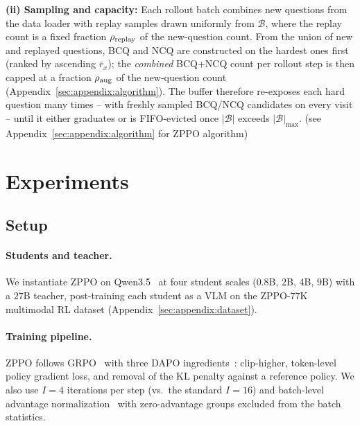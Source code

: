 \documentclass{llmxive}
\begin{document}
\textbf{(ii) Sampling and capacity:}
Each rollout batch combines new questions from the data loader with replay samples drawn uniformly from $\mathcal{B}$, where the replay count is a fixed fraction $\rho_{\rm replay}$ of the new-question count. From the union of new and replayed questions, BCQ and NCQ are constructed on the hardest ones first (ranked by ascending $\bar{r}_x$); the \emph{combined} BCQ+NCQ count per rollout step is then capped at a fraction $\rho_{\rm aug}$ of the new-question count (Appendix~\ref{sec:appendix:algorithm}). The buffer therefore re-exposes each hard question many times -- with freshly sampled BCQ/NCQ candidates on every visit -- until it either graduates or is FIFO-evicted once $|\mathcal{B}|$ exceeds $|\mathcal{B}|_{\max}$. (see Appendix~\ref{sec:appendix:algorithm} for ZPPO algorithm)
\section{Experiments}
\label{sec:experiments}

\subsection{Setup}
\label{sec:experiments:setup}

\paragraph{Students and teacher.}
We instantiate ZPPO on Qwen3.5~\citep{qwen3.5} at four student scales ($0.8$B, $2$B, $4$B, $9$B) with a $27$B teacher, post-training each student as a VLM on the ZPPO-$77$K multimodal RL dataset (Appendix~\ref{sec:appendix:dataset}).

\paragraph{Training pipeline.}
ZPPO follows GRPO~\citep{shao2024deepseekmath} with three DAPO ingredients~\citep{yu2025dapo}: clip-higher, token-level policy gradient loss, and removal of the KL penalty against a reference policy. We also use $I\!=\!4$ iterations per step (vs.\ the standard $I\!=\!16$) and batch-level advantage normalization~\citep{hu2025reinforce++} with zero-advantage groups excluded from the batch statistics.
\end{document}

